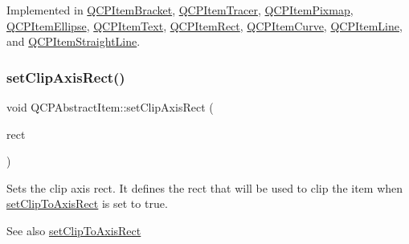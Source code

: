 Implemented in \mbox{\hyperlink{class_q_c_p_item_bracket_a49a6b2f41e0a8c2a2e3a2836027a8455}{Q\+C\+P\+Item\+Bracket}}, \mbox{\hyperlink{class_q_c_p_item_tracer_a9fd955fea40e977d66f3a9fd5765aec4}{Q\+C\+P\+Item\+Tracer}}, \mbox{\hyperlink{class_q_c_p_item_pixmap_a65d1ede7bb479b90d40186d083071947}{Q\+C\+P\+Item\+Pixmap}}, \mbox{\hyperlink{class_q_c_p_item_ellipse_ab6e2b8a29695c606c7731e498297ca29}{Q\+C\+P\+Item\+Ellipse}}, \mbox{\hyperlink{class_q_c_p_item_text_a676aaec10ad3cc4d7d0e4847db04c838}{Q\+C\+P\+Item\+Text}}, \mbox{\hyperlink{class_q_c_p_item_rect_a2e68621b75bae4da6ae0ab2cdd0dd733}{Q\+C\+P\+Item\+Rect}}, \mbox{\hyperlink{class_q_c_p_item_curve_a718fa40140a43c8afbd41a3d85c92d72}{Q\+C\+P\+Item\+Curve}}, \mbox{\hyperlink{class_q_c_p_item_line_a8e02bfbca04fbcf3dbc375a2bf693229}{Q\+C\+P\+Item\+Line}}, and \mbox{\hyperlink{class_q_c_p_item_straight_line_a2e36c9d4dcc3aeda78a5584f790e39e3}{Q\+C\+P\+Item\+Straight\+Line}}.

\mbox{\label{class_q_c_p_abstract_item_a7dc75fcbcd10206fe0b75d757ea7a347}} 
\subsubsection{\texorpdfstring{setClipAxisRect()}{setClipAxisRect()}}
{\footnotesize\ttfamily void Q\+C\+P\+Abstract\+Item\+::set\+Clip\+Axis\+Rect (\begin{DoxyParamCaption}\item[{\mbox{\hyperlink{class_q_c_p_axis_rect}{Q\+C\+P\+Axis\+Rect}} $\ast$}]{rect }\end{DoxyParamCaption})}

Sets the clip axis rect. It defines the rect that will be used to clip the item when \mbox{\hyperlink{class_q_c_p_abstract_item_a39e05b9d4176b9accafc746d16ca6a06}{set\+Clip\+To\+Axis\+Rect}} is set to true.

\begin{DoxySeeAlso}{See also}
\mbox{\hyperlink{class_q_c_p_abstract_item_a39e05b9d4176b9accafc746d16ca6a06}{set\+Clip\+To\+Axis\+Rect}} 
\end{DoxySeeAlso}
\mbox{\label{class_q_c_p_abstract_item_a39e05b9d4176b9accafc746d16ca6a06}} 
